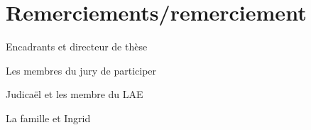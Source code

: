 \chapter*{Remerciements/remerciement}

Encadrants et directeur de thèse

Les membres du jury de participer

Judicaël et les membre du LAE

La famille et Ingrid

